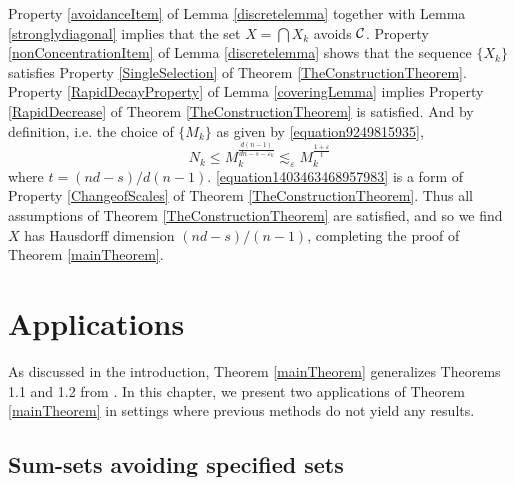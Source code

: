 Property \ref{avoidanceItem} of Lemma \ref{discretelemma} together with Lemma \ref{stronglydiagonal} implies that the set $X = \bigcap X_k$ avoids $\operatorname{\mathcal{C}}$. Property \ref{nonConcentrationItem} of Lemma \ref{discretelemma} shows that the sequence $\{ X_k \}$ satisfies Property \ref{SingleSelection} of Theorem \ref{TheConstructionTheorem}. Property \ref{RapidDecayProperty} of Lemma \ref{coveringLemma} implies Property \ref{RapidDecrease} of Theorem \ref{TheConstructionTheorem} is satisfied. And by definition, i.e. the choice of $\{ M_k \}$ as given by \eqref{equation9249815935},
%
\begin{equation} \label{equation1403463468957983} N_k \leq M_k^{\frac{d(n-1)}{dn - s - \varepsilon_k}} \lesssim_\varepsilon M_k^{\frac{1 + \varepsilon}{t}} \end{equation}
%
where $t = (nd - s)/d(n-1)$. \eqref{equation1403463468957983} is a form of Property \ref{ChangeofScales} of Theorem \ref{TheConstructionTheorem}. Thus all assumptions of Theorem \ref{TheConstructionTheorem} are satisfied, and so we find $X$ has Hausdorff dimension $(nd - s)/(n-1)$, completing the proof of Theorem \ref{mainTheorem}.










\chapter{Applications} \label{ch:Applications}

As discussed in the introduction, Theorem \ref{mainTheorem} generalizes Theorems 1.1 and 1.2 from \cite{MalabikaRob}. In this chapter, we present two applications of Theorem \ref{mainTheorem} in settings where previous methods do not yield any results.

\section{Sum-sets avoiding specified sets}

